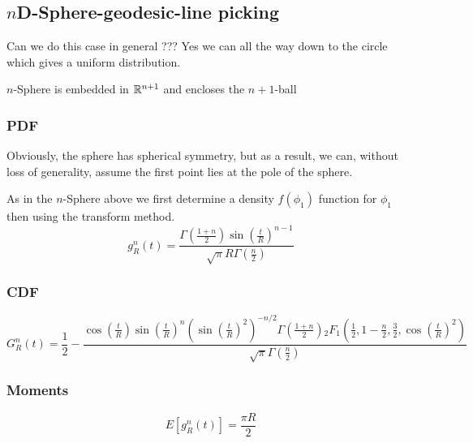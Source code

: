 \subsection{$n$D-Sphere-geodesic-line picking}
\label{sec:nsphere_geodesic_line}

Can we do this case in general ??? Yes we can all the way down to the circle which gives a uniform distribution.

$n$-Sphere is embedded in $\mathbb{R}^{n+1}$ and encloses the $n+1$-ball

\subsubsection{PDF}

Obviously, the sphere has spherical symmetry, but as a result, we can,
without loss of generality, assume the first point lies at the pole of
the sphere.

As in the $n$-Sphere above we first determine a density $f(\phi_1)$ function for $\phi_1$ then using the transform method.
\begin{equation}
g_{R}^{n}(t)=\frac{\Gamma\left(\frac{1+n}{2}\right) \sin\left(\frac{t}{R}\right)^{n-1}}{\sqrt{\pi } R \Gamma\left(\frac{n}{2}\right)}
\end{equation}

\subsubsection{CDF}
\begin{equation}
G_{R}^{n}(t)=\frac{1}{2}-\frac{\cos\left(\frac{t}{R}\right) \sin\left(\frac{t}{R}\right)^n \left(\sin\left(\frac{t}{R}\right)^2\right)^{-n/2}\Gamma\left(\frac{1+n}{2}\right) {}_{2}F_{1}\left(\frac{1}{2},1-\frac{n}{2},\frac{3}{2},\cos\left(\frac{t}{R}\right)^2\right) }  {\sqrt{\pi } \Gamma\left(\frac{n}{2}\right)}
\end{equation}

\subsubsection{Moments}

\begin{equation}
E[g_{R}^{n}(t)]=\frac{\pi R}{2}
\end{equation}




